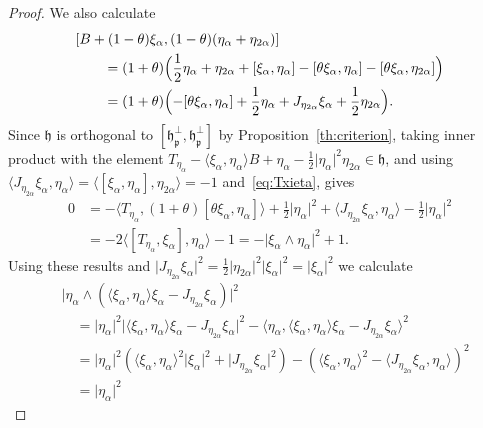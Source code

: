 \documentclass[12pt, a4paper]{amsart}
\newcommand{\g}{\mathfrak}
\theoremstyle{definition}
\begin{document}
\begin{proof}
We also calculate
\begin{equation}\label{eq:bracket-spperp}
\begin{aligned}
&{}[B+(1-\theta)\xi_\alpha,(1-\theta)(\eta_\alpha+\eta_{2\alpha})]\\
&\qquad{}=(1+\theta)\Bigl(\frac{1}{2}\eta_\alpha+\eta_{2\alpha}
+[\xi_\alpha,\eta_\alpha]-[\theta\xi_\alpha,\eta_\alpha]
-[\theta\xi_\alpha,\eta_{2\alpha}]\Bigr)\\
&\qquad{}=(1+\theta)\Bigl(-[\theta\xi_\alpha,\eta_\alpha]
+\frac{1}{2}\eta_\alpha+J_{\eta_{2\alpha}}\xi_\alpha+\frac{1}{2}\eta_{2\alpha}\Bigr).
\end{aligned}
\end{equation}
Since $\g{h}$ is orthogonal to $[\g{h}_{\g{p}}^\perp,\g{h}_{\g{p}}^\perp]$ by Proposition~\ref{th:criterion}, taking inner product with the element $T_{\eta_\alpha}-\langle\xi_\alpha,\eta_\alpha\rangle B+\eta_\alpha-\frac{1}{2}\lvert\eta_\alpha\rvert^2\eta_{2\alpha}\in\g{h}$,
and using $\langle J_{\eta_{2\alpha}}\xi_\alpha,\eta_\alpha\rangle=\langle[\xi_\alpha,\eta_\alpha],\eta_{2\alpha}\rangle=-1$ and~\eqref{eq:Txieta}, gives
\begin{align*}
0&{}=-\langle T_{\eta_\alpha},(1+\theta)[\theta\xi_\alpha,\eta_\alpha]\rangle
+\frac{1}{2}\lvert\eta_\alpha\rvert^2
+\langle J_{\eta_{2\alpha}}\xi_\alpha,\eta_\alpha\rangle
-\frac{1}{2}\lvert\eta_{\alpha}\rvert^2\\
&{}=-2\langle[T_{\eta_{\alpha}},\xi_\alpha],\eta_\alpha\rangle-1
=-\lvert\xi_\alpha\wedge\eta_\alpha\rvert^2+1.
\end{align*}
Using these results and 
$\lvert J_{\eta_{2\alpha}}\xi_\alpha\rvert^2 =\frac{1}{2}\lvert\eta_{2\alpha}\rvert^2\lvert\xi_\alpha\rvert^2 =\lvert\xi_\alpha\rvert^2$ we calculate
\begin{align*}
&\lvert\eta_\alpha\wedge(\langle\xi_\alpha,\eta_\alpha\rangle\xi_\alpha-J_{\eta_{2\alpha}}\xi_\alpha)\lvert^2\\
&\quad{}=\lvert\eta_\alpha\rvert^2
\lvert\langle\xi_\alpha,\eta_\alpha\rangle\xi_\alpha-J_{\eta_{2\alpha}}\xi_\alpha\rvert^2
-\langle\eta_\alpha,\langle\xi_\alpha,\eta_\alpha\rangle\xi_\alpha-J_{\eta_{2\alpha}}\xi_\alpha\rangle^2\\
&\quad{}=\lvert\eta_\alpha\rvert^2
(\langle\xi_\alpha,\eta_\alpha\rangle^2\lvert\xi_\alpha\rvert^2+\lvert J_{\eta_{2\alpha}}\xi_\alpha\rvert^2)
-(\langle\xi_\alpha,\eta_\alpha\rangle^2-\langle J_{\eta_{2\alpha}}\xi_\alpha,\eta_\alpha\rangle)^2\\
&\quad{}=\lvert\eta_\alpha\rvert^2

\end{align*}
\end{proof}
\end{document}
